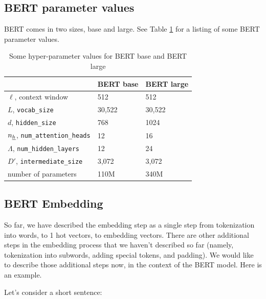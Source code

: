 \subsection{BERT parameter values}

BERT comes in two sizes, base and large.
See Table \ref{tab-bert} for a listing
of some BERT parameter values.

\begin{table}[h!]
\centering
\begin{tabular}{|l|l|l|}
\hline
 & \cellcolor[HTML]{FFFFC7}BERT base & \cellcolor[HTML]{FFFFC7}BERT large \\ \hline
\cellcolor[HTML]{FFFFC7}$\ell$, context window& 512 & 512 \\ \hline
\cellcolor[HTML]{FFFFC7}$L$, {\tt vocab\_size} & 30,522 & 30,522 \\ \hline
\cellcolor[HTML]{FFFFC7}$d$, {\tt hidden\_size} & 768 & 1024 \\ \hline
\cellcolor[HTML]{FFFFC7}$n_\rvh$, {\tt num\_attention\_heads} & 12 & 16 \\ \hline
\cellcolor[HTML]{FFFFC7}$\Lambda$, {\tt num\_hidden\_layers} & 12 & 24 \\ \hline
\cellcolor[HTML]{FFFFC7}$D'$, {\tt intermediate\_size} & 3,072 & 3,072 \\ \hline
\cellcolor[HTML]{FFFFC7}number of parameters & 110M & 340M \\ \hline
\end{tabular}
\caption{Some hyper-parameter values for BERT base and BERT large}
\label{tab-bert}
\end{table}

\subsection{BERT Embedding}
So far, we have described the embedding step as a single step
from tokenization into words, to 1 hot vectors, to embedding vectors.
 There are
other additional steps in  the embedding
process that  we haven't
described so far (namely, tokenization
into subwords,
adding special tokens, and
padding). We would like to
describe those additional steps now, in the context of
 the BERT model. Here is an example.


Let's consider a short sentence: 

